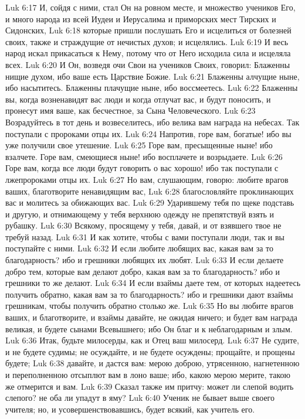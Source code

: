 Luk 6:17  И, сойдя с ними, стал Он на ровном месте, и множество учеников Его, и много народа из всей Иудеи и Иерусалима и приморских мест Тирских и Сидонских,
Luk 6:18  которые пришли послушать Его и исцелиться от болезней своих, также и страждущие от нечистых духов; и исцелялись.
Luk 6:19  И весь народ искал прикасаться к Нему, потому что от Него исходила сила и исцеляла всех.
Luk 6:20  И Он, возведя очи Свои на учеников Своих, говорил: Блаженны нищие духом, ибо ваше есть Царствие Божие.
Luk 6:21  Блаженны алчущие ныне, ибо насытитесь. Блаженны плачущие ныне, ибо воссмеетесь.
Luk 6:22  Блаженны вы, когда возненавидят вас люди и когда отлучат вас, и будут поносить, и пронесут имя ваше, как бесчестное, за Сына Человеческого.
Luk 6:23  Возрадуйтесь в тот день и возвеселитесь, ибо велика вам награда на небесах. Так поступали с пророками отцы их.
Luk 6:24  Напротив, горе вам, богатые! ибо вы уже получили свое утешение.
Luk 6:25  Горе вам, пресыщенные ныне! ибо взалчете. Горе вам, смеющиеся ныне! ибо восплачете и возрыдаете.
Luk 6:26  Горе вам, когда все люди будут говорить о вас хорошо! ибо так поступали с лжепророками отцы их.
Luk 6:27  Но вам, слушающим, говорю: любите врагов ваших, благотворите ненавидящим вас,
Luk 6:28  благословляйте проклинающих вас и молитесь за обижающих вас.
Luk 6:29  Ударившему тебя по щеке подставь и другую, и отнимающему у тебя верхнюю одежду не препятствуй взять и рубашку.
Luk 6:30  Всякому, просящему у тебя, давай, и от взявшего твое не требуй назад.
Luk 6:31  И как хотите, чтобы с вами поступали люди, так и вы поступайте с ними.
Luk 6:32  И если любите любящих вас, какая вам за то благодарность? ибо и грешники любящих их любят.
Luk 6:33  И если делаете добро тем, которые вам делают добро, какая вам за то благодарность? ибо и грешники то же делают.
Luk 6:34  И если взаймы даете тем, от которых надеетесь получить обратно, какая вам за то благодарность? ибо и грешники дают взаймы грешникам, чтобы получить обратно столько же.
Luk 6:35  Но вы любите врагов ваших, и благотворите, и взаймы давайте, не ожидая ничего; и будет вам награда великая, и будете сынами Всевышнего; ибо Он благ и к неблагодарным и злым.
Luk 6:36  Итак, будьте милосерды, как и Отец ваш милосерд.
Luk 6:37  Не судите, и не будете судимы; не осуждайте, и не будете осуждены; прощайте, и прощены будете;
Luk 6:38  давайте, и дастся вам: мерою доброю, утрясенною, нагнетенною и переполненною отсыплют вам в лоно ваше; ибо, какою мерою мерите, такою же отмерится и вам.
Luk 6:39  Сказал также им притчу: может ли слепой водить слепого? не оба ли упадут в яму?
Luk 6:40  Ученик не бывает выше своего учителя; но, и усовершенствовавшись, будет всякий, как учитель его.
